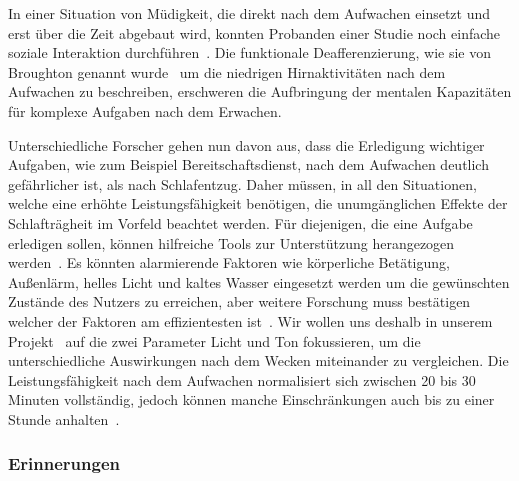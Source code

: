 In einer Situation von Müdigkeit, die direkt nach dem Aufwachen einsetzt und erst über die Zeit abgebaut wird, konnten Probanden einer Studie noch einfache soziale Interaktion durchführen~\cite{dinges1990you}. 
Die funktionale Deafferenzierung, wie sie von Broughton genannt wurde~\cite{broughton1968sleep} um die niedrigen Hirnaktivitäten nach dem Aufwachen zu beschreiben, erschweren die Aufbringung der mentalen Kapazitäten für komplexe Aufgaben nach dem Erwachen.

Unterschiedliche Forscher gehen nun davon aus, dass die Erledigung wichtiger Aufgaben, wie zum Beispiel Bereitschaftsdienst, nach dem Aufwachen deutlich gefährlicher ist, als nach Schlafentzug.
Daher müssen, in all den Situationen, welche eine erhöhte Leistungsfähigkeit benötigen, die unumgänglichen Effekte der Schlafträgheit im Vorfeld beachtet werden. 
Für diejenigen, die eine Aufgabe erledigen sollen, können hilfreiche Tools zur Unterstützung herangezogen werden~\cite{ferrara2000sleep}. 
Es könnten alarmierende Faktoren wie körperliche Betätigung, Außenlärm, helles Licht und kaltes Wasser eingesetzt werden um die gewünschten Zustände des Nutzers zu erreichen, aber weitere Forschung muss bestätigen welcher der Faktoren am effizientesten ist~\cite{ferrara2000sleep}.
Wir wollen uns deshalb in unserem Projekt \projectName \ auf die zwei Parameter Licht und Ton fokussieren, um die unterschiedliche Auswirkungen nach dem Wecken miteinander zu vergleichen.
Die Leistungsfähigkeit nach dem Aufwachen normalisiert sich zwischen 20 bis 30 Minuten vollständig, jedoch können manche Einschränkungen auch bis zu einer Stunde anhalten~\cite{online:muedesGehirn}.

\subsubsection{Erinnerungen}

